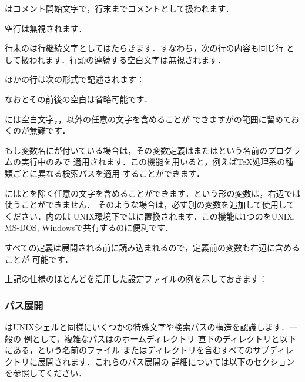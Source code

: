 \documentclass[uplatex,dvipdfmx,tombow]{jsarticle}
\begin{document}
\begin{itemize*}
\item \code{\%}はコメント開始文字で，行末までコメントとして扱われます．
\item 空行は無視されます．
\item 行末の\code{\bs}は行継続文字としてはたらきます．すなわち，次の行の内容も同じ行
  として扱われます．行頭の連続する空白文字は無視されます．
\item ほかの行は次の形式で記述されます：
%
\begin{alltt}
   \optional{=} 
\end{alltt}
%
  なお\samp{=}とその前後の空白は省略可能です．
\item {}には空白文字，\samp{=}，以外の任意の文字を含めることが
  できますがの範囲に留めておくのが無難です．
\item もし変数名にが付いている場合は，その変数定義はまたはという名前のプログラムの実行中のみで
  適用されます．この機能を用いると，例えば\TeX 処理系の種類ごとに異なる検索パスを適用
  することができます．
\item {}には\samp{\%}とを除く任意の文字を含めることができます．という形の変数は，右辺では使うことができません．
  そのような場合は，必ず別の変数を追加して使用してください．内の\samp{;}は
  UNIX環境下では\samp{:}に置換されます．この機能は1つのをUNIX, MS-DOS,
  Windowsで共有するのに便利です．
\item すべての定義は展開される前に読み込まれるので，定義前の変数も右辺に含めることが
  可能です．
\end{itemize*}
%
上記の仕様のほとんどを活用した設定ファイルの例を示しておきます：
%


\subsubsection{パス展開}
\label{sec:path-expansion}

\KPS はUNIXシェルと同様にいくつかの特殊文字や検索パスの構造を認識します．一般の
例として，複雑なパスはのホームディレクトリ
直下のディレクトリと以下にある，という名前のファイル
またはディレクトリを含むすべてのサブディレクトリに展開されます．これらのパス展開の
詳細については以下のセクションを参照してください．
\end{document}
